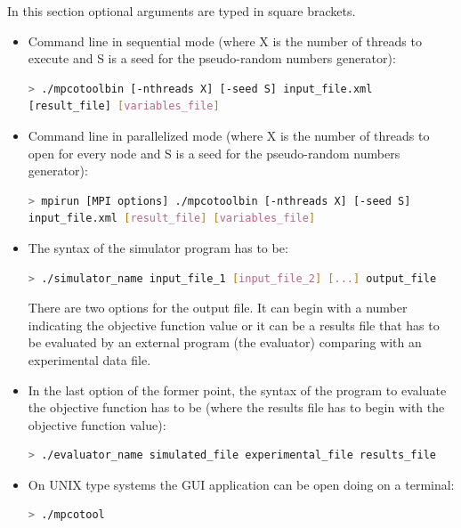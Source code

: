 \documentclass[a4paper]{report}
\begin{document}
In this section optional arguments are typed in square brackets.

\begin{itemize}

\item Command line in sequential mode (where X is the number of threads to
execute and S is a seed for the pseudo-random numbers generator):
\begin{lstlisting}[language=bash,basicstyle=\scriptsize]
> ./mpcotoolbin [-nthreads X] [-seed S] input_file.xml
[result_file] [variables_file]
\end{lstlisting}

\item Command line in parallelized mode (where X is the number of threads to
open for every node and S is a seed for the pseudo-random numbers generator):
\begin{lstlisting}[language=bash,basicstyle=\scriptsize]
> mpirun [MPI options] ./mpcotoolbin [-nthreads X] [-seed S]
input_file.xml [result_file] [variables_file]
\end{lstlisting}

\item The syntax of the simulator program has to be:
\begin{lstlisting}[language=bash,basicstyle=\scriptsize]
> ./simulator_name input_file_1 [input_file_2] [...] output_file
\end{lstlisting}
There are two options for the output file. It can begin with a number indicating
the objective function value or it can be a results file that has to be
evaluated by an external program (the evaluator) comparing with an experimental
data file.

\item In the last option of the former point, the syntax of the program to
evaluate the objective function has to be (where the results file has to begin
with the objective function value):
\begin{lstlisting}[language=bash,basicstyle=\scriptsize]
> ./evaluator_name simulated_file experimental_file results_file
\end{lstlisting}

\item On UNIX type systems the GUI application can be open doing on a terminal:
\begin{lstlisting}[language=bash,basicstyle=\scriptsize]
> ./mpcotool
\end{lstlisting}

\end{itemize}
\end{document}
